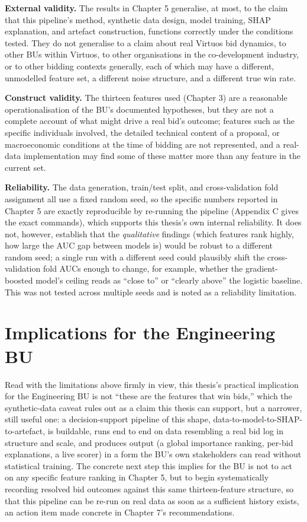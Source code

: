 \textbf{External validity.} The results in Chapter 5 generalise, at
most, to the claim that this pipeline's method, synthetic data design,
model training, SHAP explanation, and artefact construction, functions
correctly under the conditions tested. They do not generalise to a claim
about real Virtuos bid dynamics, to other BUs within Virtuos, to other
organisations in the co-development industry, or to other bidding
contexts generally, each of which may have a different, unmodelled
feature set, a different noise structure, and a different true win rate.

\textbf{Construct validity.} The thirteen features used (Chapter 3) are
a reasonable operationalisation of the BU's documented hypotheses, but
they are not a complete account of what might drive a real bid's
outcome; features such as the specific individuals involved, the
detailed technical content of a proposal, or macroeconomic conditions at
the time of bidding are not represented, and a real-data implementation
may find some of these matter more than any feature in the current set.

\textbf{Reliability.} The data generation, train/test split, and
cross-validation fold assignment all use a fixed random seed, so the
specific numbers reported in Chapter 5 are exactly reproducible by
re-running the pipeline (Appendix C gives the exact commands), which
supports this thesis's own internal reliability. It does not, however,
establish that the \emph{qualitative} findings (which features rank
highly, how large the AUC gap between models is) would be robust to a
different random seed; a single run with a different seed could
plausibly shift the cross-validation fold AUCs enough to change, for
example, whether the gradient-boosted model's ceiling reads as ``close
to'' or ``clearly above'' the logistic baseline. This was not tested
across multiple seeds and is noted as a reliability limitation.

\hypertarget{implications-for-the-engineering-bu}{%
\section{Implications for the Engineering
BU}\label{implications-for-the-engineering-bu}}

Read with the limitations above firmly in view, this thesis's practical
implication for the Engineering BU is not ``these are the features that
win bids,'' which the synthetic-data caveat rules out as a claim this
thesis can support, but a narrower, still useful one: a decision-support
pipeline of this shape, data-to-model-to-SHAP-to-artefact, is buildable,
runs end to end on data resembling a real bid log in structure and
scale, and produces output (a global importance ranking, per-bid
explanations, a live scorer) in a form the BU's own stakeholders can
read without statistical training. The concrete next step this implies
for the BU is not to act on any specific feature ranking in Chapter 5,
but to begin systematically recording resolved bid outcomes against this
same thirteen-feature structure, so that this pipeline can be re-run on
real data as soon as a sufficient history exists, an action item made
concrete in Chapter 7's recommendations.
